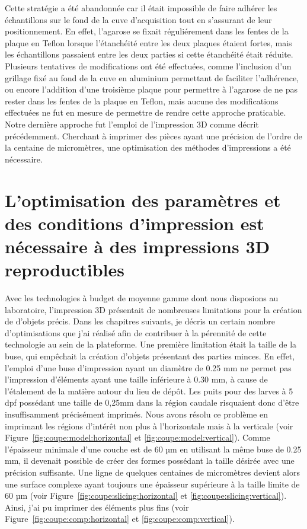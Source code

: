 \documentclass[\main/main.tex]{subfiles}
\begin{document}
%
Cette stratégie a été abandonnée car il était impossible de faire adhérer les échantillons sur le fond de la cuve d'acquisition tout en s'assurant de leur positionnement.
%
En effet, l'agarose se fixait réguliérement dans les fentes de la plaque en Teflon lorsque l'étanchéité entre les deux plaques étaient fortes, mais les échantillons passaient entre les deux parties si cette étanchéité était réduite.
%
Plusieurs tentatives de modifications ont été effectuées, comme l'inclusion d'un grillage fixé au fond de la cuve en aluminium permettant de faciliter l'adhérence, ou encore l'addition d'une troisième plaque pour permettre à l'agarose de ne pas rester dans les fentes de la plaque en Teflon, mais aucune des modifications effectuées ne fut en mesure de permettre de rendre cette approche praticable.
%
Notre dernière approche fut l'emploi de l'impression 3D comme décrit précédemment.
%
Cherchant à imprimer des pièces ayant une précision de l'ordre de la centaine de micromètres, une optimisation des méthodes d'impressions a été nécessaire. 

    \section{L'optimisation des paramètres et des conditions d'impression est nécessaire à des impressions 3D reproductibles}

%
Avec les technologies à budget de moyenne gamme dont nous disposions au laboratoire, l'impression 3D présentait de nombreuses limitations pour la création de d'objets précis. Dans les chapitres suivants, je décris un certain nombre d'optimisations que j'ai réalisé afin de contribuer à la pérennité de cette technologie au sein de la plateforme.
%
Une première limitation était la taille de la buse, qui empêchait la création d'objets présentant des parties minces.
%
En effet, l'emploi d'une buse d'impression ayant un diamètre de 0.25 mm ne permet pas l'impression d'éléments ayant une taille inférieure à 0.30 mm, à cause de l'étalement de la matière autour du lieu de dépôt. Les puits pour des larves à 5 dpf possédant une taille de 0,25mm dans la région caudale risquaient donc d'être insuffisamment précisément imprimés.
%
Nous avons résolu ce problème en imprimant les régions d'intérêt non plus à l'horizontale mais à la verticale (voir Figure~\ref{fig:coupe:model:horizontal} et \ref{fig:coupe:model:vertical}). Comme l'épaisseur minimale d'une couche est de 60 µm en utilisant la même buse de 0.25 mm, il devenait possible de créer des formes possédant la taille désirée avec une précision suffisante.
%
Une ligne de quelques centaines de micromètres devient alors une surface complexe ayant toujours une épaisseur supérieure à la taille limite de 60 µm  (voir Figure~\ref{fig:coupe:slicing:horizontal} et \ref{fig:coupe:slicing:vertical}).
%
Ainsi, j'ai pu imprimer des éléments plus fins (voir Figure~\ref{fig:coupe:comp:horizontal} et \ref{fig:coupe:comp:vertical}).
\end{document}
